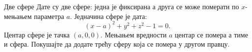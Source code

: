 \begin{surferPage}{Две сфере}
Дате су две сфере: једна је фиксирана а друга се може померати по $x$- мењањем параметра $a$.
Једначина сфере је дата:
\[(x-a)^2+y^2+z^2-1=0.\]
Центар сфере је тачка $(a,0,0)$. Мењањем вредности $a$ центар се помера а тиме и сфера.
Покушајте да додате трећу сферу која се помера у другом правцу.
\end{surferPage}
